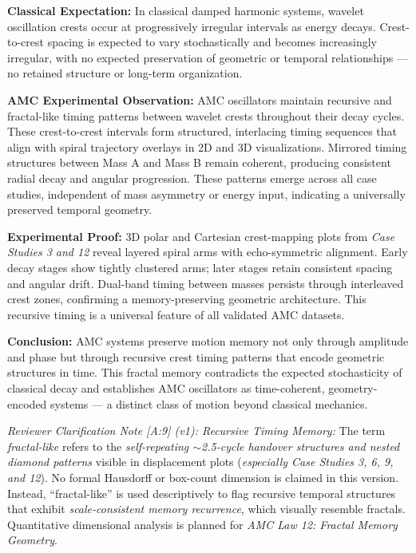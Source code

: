 \documentclass[10pt,aps,pre,onecolumn,superscriptaddress,notitlepage]{revtex4-2}
\begin{document}
\textbf{Classical Expectation:} In classical damped harmonic systems, wavelet oscillation crests occur at progressively irregular intervals as energy decays. Crest-to-crest spacing is expected to vary stochastically and becomes increasingly irregular, with no expected preservation of geometric or temporal relationships — no retained structure or long-term organization.

\textbf{AMC Experimental Observation:} AMC oscillators maintain recursive and fractal-like timing patterns between wavelet crests throughout their decay cycles. These crest-to-crest intervals form structured, interlacing timing sequences that align with spiral trajectory overlays in 2D and 3D visualizations. Mirrored timing structures between Mass A and Mass B remain coherent, producing consistent radial decay and angular progression. These patterns emerge across all case studies, independent of mass asymmetry or energy input, indicating a universally preserved temporal geometry.

\textbf{Experimental Proof:} 3D polar and Cartesian crest-mapping plots from \textit{Case Studies 3 and 12} reveal layered spiral arms with echo-symmetric alignment. Early decay stages show tightly clustered arms; later stages retain consistent spacing and angular drift. Dual-band timing between masses persists through interleaved crest zones, confirming a memory-preserving geometric architecture. This recursive timing is a universal feature of all validated AMC datasets.

\textbf{Conclusion:} AMC systems preserve motion memory not only through amplitude and phase but through recursive crest timing patterns that encode geometric structures in time. This fractal memory contradicts the expected stochasticity of classical decay and establishes AMC oscillators as time-coherent, geometry-encoded systems — a distinct class of motion beyond classical mechanics.

\noindent \textit{Reviewer Clarification Note [A:9] (v1): Recursive Timing Memory:} The term \textit{fractal-like} refers to the \textit{self-repeating $\sim$2.5-cycle handover structures and nested diamond patterns} visible in displacement plots (\textit{especially Case Studies 3, 6, 9, and 12}). No formal Hausdorff or box-count dimension is claimed in this version. Instead, “fractal-like” is used descriptively to flag recursive temporal structures that exhibit \textit{scale-consistent memory recurrence}, which visually resemble fractals. Quantitative dimensional analysis is planned for \textit{AMC Law 12: Fractal Memory Geometry}.
\end{document}
